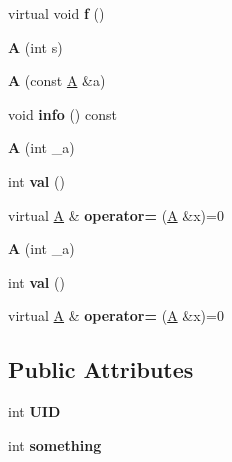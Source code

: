 \begin{DoxyCompactItemize}
\item 
\hypertarget{classA_a4568a90d407ebae1b5ae9155dbc263af}{virtual void {\bfseries f} ()}\label{classA_a4568a90d407ebae1b5ae9155dbc263af}

\item 
\hypertarget{classA_a5c9537376ae61a89cc327b51d7f3f0b3}{{\bfseries A} (int s)}\label{classA_a5c9537376ae61a89cc327b51d7f3f0b3}

\item 
\hypertarget{classA_ae2af0b03e615d3b68e161cf29b88d90c}{{\bfseries A} (const \hyperlink{classA}{A} \&a)}\label{classA_ae2af0b03e615d3b68e161cf29b88d90c}

\item 
\hypertarget{classA_a3002802633cd4b7d9a226c15ab57a6da}{void {\bfseries info} () const }\label{classA_a3002802633cd4b7d9a226c15ab57a6da}

\item 
\hypertarget{classA_a02a14e9e9c66cc288c34555988ce9410}{{\bfseries A} (int \-\_\-a)}\label{classA_a02a14e9e9c66cc288c34555988ce9410}

\item 
\hypertarget{classA_a8010f5e403b1f9d104360d5c77e68d68}{int {\bfseries val} ()}\label{classA_a8010f5e403b1f9d104360d5c77e68d68}

\item 
\hypertarget{classA_a1aef5e4848d8935206fcc6ca04b80db9}{virtual \hyperlink{classA}{A} \& {\bfseries operator=} (\hyperlink{classA}{A} \&x)=0}\label{classA_a1aef5e4848d8935206fcc6ca04b80db9}

\item 
\hypertarget{classA_a02a14e9e9c66cc288c34555988ce9410}{{\bfseries A} (int \-\_\-a)}\label{classA_a02a14e9e9c66cc288c34555988ce9410}

\item 
\hypertarget{classA_a8010f5e403b1f9d104360d5c77e68d68}{int {\bfseries val} ()}\label{classA_a8010f5e403b1f9d104360d5c77e68d68}

\item 
\hypertarget{classA_a1aef5e4848d8935206fcc6ca04b80db9}{virtual \hyperlink{classA}{A} \& {\bfseries operator=} (\hyperlink{classA}{A} \&x)=0}\label{classA_a1aef5e4848d8935206fcc6ca04b80db9}

\end{DoxyCompactItemize}
\subsection*{Public Attributes}
\begin{DoxyCompactItemize}
\item 
\hypertarget{classA_a81c7394c6570bc8115e1e39230ee3c0e}{int {\bfseries U\-I\-D}}\label{classA_a81c7394c6570bc8115e1e39230ee3c0e}

\item 
\hypertarget{classA_a6b99184d37198b84376a7ba2e250d033}{int {\bfseries something}}\label{classA_a6b99184d37198b84376a7ba2e250d033}

\end{DoxyCompactItemize}
